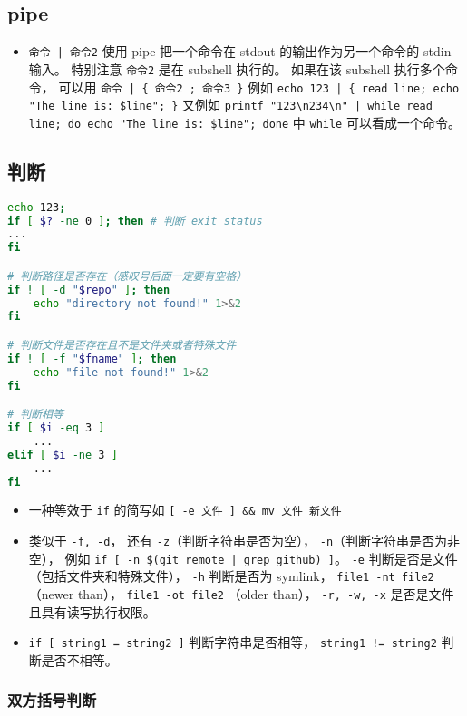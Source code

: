 \subsection{pipe}
\begin{itemize}
\item \verb`命令 | 命令2` 使用 pipe 把一个命令在 stdout 的输出作为另一个命令的 stdin 输入。 特别注意 \verb`命令2` 是在 subshell 执行的。 如果在该 subshell 执行多个命令， 可以用 \verb`命令 | { 命令2 ; 命令3 }` 例如 \verb`echo 123 | { read line; echo "The line is: $line"; }` 又例如 \verb`printf "123\n234\n" | while read line; do echo "The line is: $line"; done` 中 \verb`while` 可以看成一个命令。
\end{itemize}


\subsection{判断}
\begin{lstlisting}[language=bash]
echo 123;
if [ $? -ne 0 ]; then # 判断 exit status
...
fi

# 判断路径是否存在（感叹号后面一定要有空格）
if ! [ -d "$repo" ]; then
    echo "directory not found!" 1>&2
fi

# 判断文件是否存在且不是文件夹或者特殊文件
if ! [ -f "$fname" ]; then
    echo "file not found!" 1>&2
fi

# 判断相等
if [ $i -eq 3 ]
    ...
elif [ $i -ne 3 ]
    ...
fi
\end{lstlisting}
\begin{itemize}
\item 一种等效于 \verb`if` 的简写如 \verb`[ -e 文件 ] && mv 文件 新文件`
\item 类似于 \verb`-f, -d`， 还有 \verb`-z`（判断字符串是否为空）， \verb`-n`（判断字符串是否为非空）， 例如 \verb`if [ -n $(git remote | grep github) ]`。  \verb`-e` 判断是否是文件（包括文件夹和特殊文件）， \verb`-h` 判断是否为 symlink， \verb`file1 -nt file2` （newer than）， \verb`file1 -ot file2` （older than）， \verb`-r, -w, -x` 是否是文件且具有读写执行权限。
\item \verb`if [ string1 = string2 ]` 判断字符串是否相等， \verb`string1 != string2` 判断是否不相等。
\end{itemize}

\subsubsection{双方括号判断}

